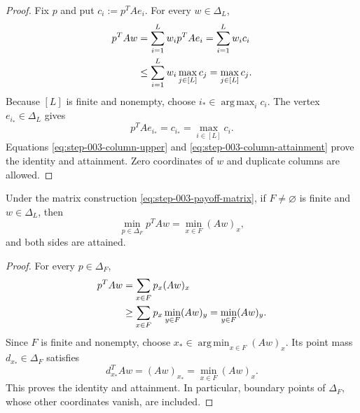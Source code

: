 \begin{proof}
Fix \(p\) and put \(c_i:=p^{T}Ae_i\).  For every \(w\in\Delta_L\),
\begin{align}
p^{T}Aw
&=\sum_{i=1}^Lw_i p^{T}Ae_i
=\sum_{i=1}^Lw_ic_i \notag\\
&\le\sum_{i=1}^Lw_i\max_{j\in[L]}c_j
=\max_{j\in[L]}c_j.
\label{eq:step-003-column-upper}
\end{align}
Because \([L]\) is finite and nonempty, choose
\(i_*\in\operatorname*{arg\,max}_i c_i\).  The vertex
\(e_{i_*}\in\Delta_L\) gives
\begin{equation}
p^{T}Ae_{i_*}=c_{i_*}=\max_{i\in[L]}c_i.
\label{eq:step-003-column-attainment}
\end{equation}
Equations \eqref{eq:step-003-column-upper} and
\eqref{eq:step-003-column-attainment} prove the identity and attainment.
Zero coordinates of \(w\) and duplicate columns are allowed.
\end{proof}

\begin{lemma}
\label{lem:step-003-row-vertices}
Under the matrix construction \eqref{eq:step-003-payoff-matrix}, if
\(F\ne\varnothing\) is finite and \(w\in\Delta_L\), then
\begin{equation}
\min_{p\in\Delta_F}p^{T}Aw
=\min_{x\in F}(Aw)_x,
\label{eq:step-003-row-identity}
\end{equation}
and both sides are attained.
\end{lemma}

\begin{proof}
For every \(p\in\Delta_F\),
\begin{align}
p^{T}Aw
&=\sum_{x\in F}p_x(Aw)_x \notag\\
&\ge\sum_{x\in F}p_x\min_{y\in F}(Aw)_y
=\min_{y\in F}(Aw)_y.
\label{eq:step-003-row-lower}
\end{align}
Since \(F\) is finite and nonempty, choose
\(x_*\in\operatorname*{arg\,min}_{x\in F}(Aw)_x\).  Its point mass
\(d_{x_*}\in\Delta_F\) satisfies
\begin{equation}
d_{x_*}^{T}Aw=(Aw)_{x_*}=\min_{x\in F}(Aw)_x.
\label{eq:step-003-row-attainment}
\end{equation}
This proves the identity and attainment.  In particular, boundary points of
\(\Delta_F\), whose other coordinates vanish, are included.
\end{proof}

